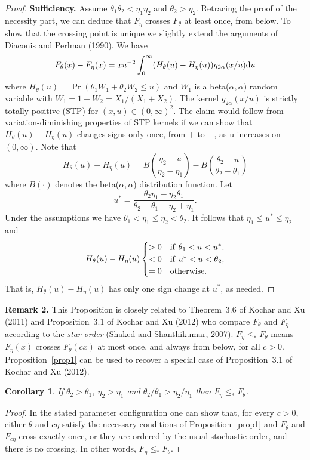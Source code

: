 \documentclass[11pt]{article}
\newtheorem{corollary}{\bf Corollary}
\begin{document}
\begin{proof}
{\bf Sufficiency.} Assume $\theta_1\theta_2 < \eta_1 \eta_2$ and $\theta_2 > \eta_2$.  Retracing the proof of the necessity part, we can deduce that $F_\eta$ crosses $F_\theta$ at least once, from below.  To show that the crossing point is unique we slightly extend the arguments of Diaconis and Perlman (1990).  We have 
$$F_\theta(x) - F_\eta(x) = x u^{-2} \int_0^\infty (H_\theta(u) - H_\eta(u)) g_{2\alpha}(x/u) {\rm d} u$$
where $H_\theta(u) = \Pr(\theta_1 W_1 + \theta_2 W_2 \leq u)$ and $W_1$ is a beta($\alpha, \alpha$) random variable with $W_1 = 1-W_2 = X_1/(X_1 + X_2).$ The kernel $g_{2\alpha}(x/u)$ is strictly totally positive (STP) for $(x, u) \in (0, \infty)^2$.  The claim would follow from variation-diminishing properties of STP kernels if we can show that $H_\theta(u) -H_\eta(u)$ changes signs only once, from $+$ to $-$, as u increases on $(0, \infty)$.  Note that 
$$H_\theta(u) - H_\eta(u) =B\left(\frac{\eta_2 - u}{\eta_2 -\eta_1}\right) - B\left(\frac{\theta_2 -u}{\theta_2 -\theta_1}\right)$$
where $B(\cdot)$ denotes the beta($\alpha, \alpha$) distribution function.  Let 
$$u^* = \frac{\theta_2 \eta_1 - \eta_2 \theta_1}{\theta_2 -\theta_1 -\eta_2 +\eta_1}.$$
Under the assumptions we have $\theta_1< \eta_1 \leq \eta_2 <\theta_2$.  It follows that $\eta_1 \leq u^* \leq \eta_2 $ and 
$$
H_\theta(u) - H_\eta(u) \begin{cases} > 0 & {\rm if}\ \theta_1 < u < u^*,\\
  < 0 & {\rm if}\  u^* < u < \theta_2,\\
  =0 & {\rm otherwise}.
 \end{cases}
$$
That is, $H_\theta(u) - H_\eta(u)$ has only one sign change at $u^*$, as needed.
 \end{proof}
{\bf Remark 2.} This Proposition is closely related to Theorem~3.6 of Kochar and Xu (2011) and Proposition~3.1 of Kochar and Xu (2012) who compare $F_\theta$ and $F_\eta$ according to the {\it star order} (Shaked and Shanthikumar, 2007).  $F_\eta \leq_{*} F_\theta$ means $F_\eta(x)$ crosses $F_\theta(cx)$ at most once, and always from below, for all $c>0$.  Proposition~\ref{prop1} can be used to recover a special case of Proposition~3.1 of Kochar and Xu (2012). 
\begin{corollary}
If $\theta_2>\theta_1,\ \eta_2>\eta_1$ and $\theta_2/\theta_1 > \eta_2/\eta_1$ then $F_\eta \leq_* F_\theta$.
\end{corollary}
 \begin{proof}
In the stated parameter configuration one can show that, for every $c>0$, either $\theta$ and $c\eta$ satisfy the necessary conditions of Proposition~\ref{prop1} and  $F_\theta$ and $F_{c\eta} $ cross exactly once, or they are ordered by the usual stochastic order, and there is no crossing.  In other words, $F_\eta \leq_* F_\theta$.
\end{proof}
\end{document}
